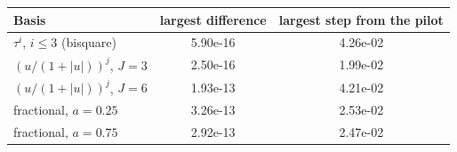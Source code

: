 \begin{tabular}{lcc}
\toprule
Basis & largest difference & largest step from the pilot \\
\midrule
$\tau^i$, $i\le3$ (bisquare) & 5.90e-16 & 4.26e-02 \\
$(u/(1+|u|))^j$, $J=3$ & 2.50e-16 & 1.99e-02 \\
$(u/(1+|u|))^j$, $J=6$ & 1.93e-13 & 4.21e-02 \\
fractional, $a=0.25$ & 3.26e-13 & 2.53e-02 \\
fractional, $a=0.75$ & 2.92e-13 & 2.47e-02 \\
\bottomrule
\end{tabular}
